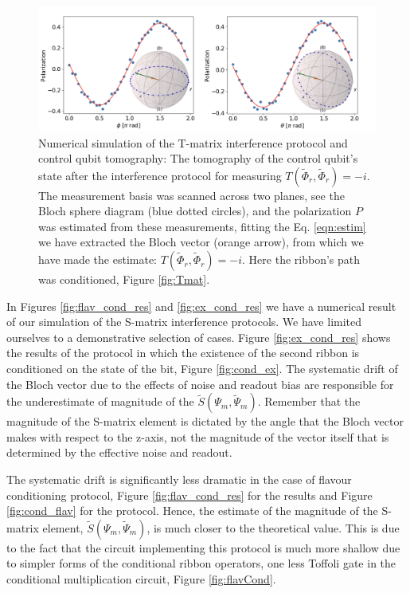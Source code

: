 \documentclass[two column]{article}
\begin{document}
\begin{figure}
    \centering
    \includegraphics[width=\textwidth]{Figures/t_j_minus.pdf}
    \caption{Numerical simulation of the T-matrix interference protocol and control qubit tomography: The tomography of the control qubit's state after the interference protocol for measuring $T(\tilde{\Phi}_r, \tilde{\Phi}_r) = -i$. The measurement basis was scanned across two planes, see the Bloch sphere diagram (blue dotted circles), and the polarization $P$ was estimated from these measurements, fitting the Eq. \ref{eqn:estim} we have extracted the Bloch vector (orange arrow), from which we have made the estimate: $T(\tilde{\Phi}_r, \tilde{\Phi}_r) = -i$. Here the ribbon's path was conditioned, Figure \ref{fig:Tmat}.}
    \label{fig:t_mat_results}
\end{figure}

In Figures \ref{fig:flav_cond_res} and \ref{fig:ex_cond_res} we have a numerical result of our simulation of the S-matrix interference protocols. We have limited ourselves to a demonstrative selection of cases. Figure \ref{fig:ex_cond_res} shows the results of the protocol in which the existence of the second ribbon is conditioned on the state of the bit, Figure \ref{fig:cond_ex}. The systematic drift of the Bloch vector due to the effects of noise and readout bias are responsible for the underestimate of magnitude of the $\tilde{S}(\Psi_m, \tilde{\Psi}_m)$. Remember that the magnitude of the S-matrix element is dictated by the angle that the Bloch vector makes with respect to the z-axis, not the magnitude of the vector itself that is determined by the effective noise and readout.

The systematic drift is significantly less dramatic in the case of flavour conditioning protocol, Figure \ref{fig:flav_cond_res} for the results and Figure \ref{fig:cond_flav} for the protocol. Hence, the estimate of the magnitude of the S-matrix element, $\tilde{S}(\Psi_m, \tilde{\Psi}_m)$, is much closer to the theoretical value. This is due to the fact that the circuit implementing this protocol is much more shallow due to simpler forms of the conditional ribbon operators, one less Toffoli gate in the conditional multiplication circuit, Figure \ref{fig:flavCond}.
\end{document}

